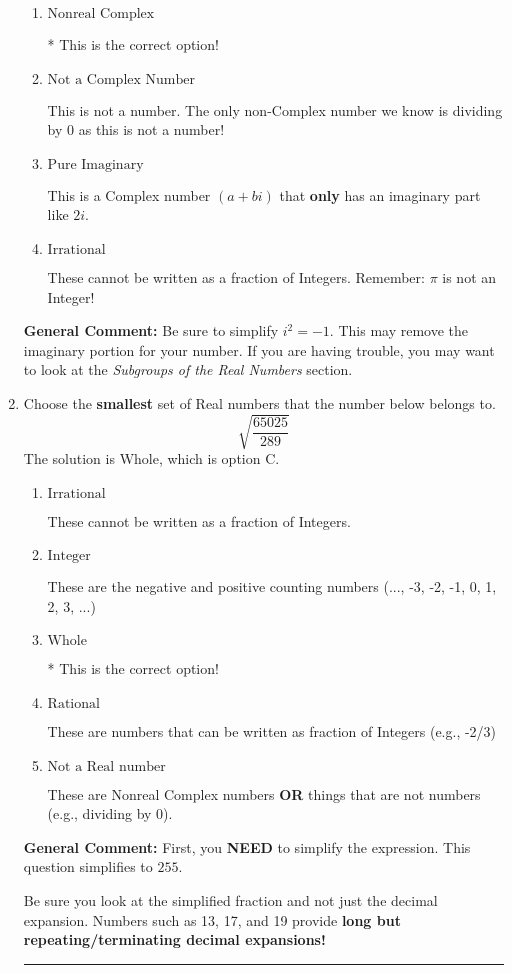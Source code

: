 \documentclass{extbook}[14pt]
\newcommand{\litem}[1]{\item #1

\rule{\textwidth}{0.4pt}}
\begin{document}
\begin{enumerate}
{\begin{enumerate}[label=\Alph*.]
These are numbers that can be written as fraction of Integers (e.g., -2/3 + 5)
\item \( \text{Nonreal Complex} \)

* This is the correct option!
\item \( \text{Not a Complex Number} \)

This is not a number. The only non-Complex number we know is dividing by 0 as this is not a number!
\item \( \text{Pure Imaginary} \)

This is a Complex number $(a+bi)$ that \textbf{only} has an imaginary part like $2i$.
\item \( \text{Irrational} \)

These cannot be written as a fraction of Integers. Remember: $\pi$ is not an Integer!
\end{enumerate}

\textbf{General Comment:} Be sure to simplify $i^2 = -1$. This may remove the imaginary portion for your number. If you are having trouble, you may want to look at the \textit{Subgroups of the Real Numbers} section.
}
\litem{
Choose the \textbf{smallest} set of Real numbers that the number below belongs to.
\[ \sqrt{\frac{65025}{289}} \]
The solution is \( \text{Whole} \), which is option C.\begin{enumerate}[label=\Alph*.]
\item \( \text{Irrational} \)

These cannot be written as a fraction of Integers.
\item \( \text{Integer} \)

These are the negative and positive counting numbers (..., -3, -2, -1, 0, 1, 2, 3, ...)
\item \( \text{Whole} \)

* This is the correct option!
\item \( \text{Rational} \)

These are numbers that can be written as fraction of Integers (e.g., -2/3)
\item \( \text{Not a Real number} \)

These are Nonreal Complex numbers \textbf{OR} things that are not numbers (e.g., dividing by 0).
\end{enumerate}

\textbf{General Comment:} First, you \textbf{NEED} to simplify the expression. This question simplifies to $255$. 
 
 Be sure you look at the simplified fraction and not just the decimal expansion. Numbers such as 13, 17, and 19 provide \textbf{long but repeating/terminating decimal expansions!} 
 
}
\end{enumerate}
\end{document}
